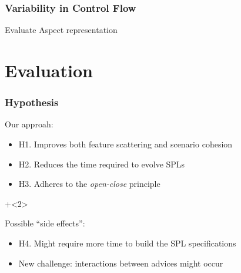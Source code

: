 \documentclass[xcolor=svgnames]{beamer}
\begin{document}
\begin{frame}
\frametitle{Variability in Control Flow}
\begin{block}{Evaluate Aspect representation}

\begin{center} 
\end{center}

\end{block}
\end{frame}



\section{Evaluation}

\begin{frame}
\frametitle{Hypothesis}

\begin{block}{Our approah:}

\begin{itemize}
  \item H1. Improves both feature scattering and scenario cohesion
  \item H2. Reduces the time required to evolve SPLs
  \item H3. Adheres to the \emph{open-close} principle
\end{itemize}
\end{block}

\onslide+<2>

\begin{block}{Possible ``side effects'':}

\begin{itemize}
  \item H4. Might require more time to build the SPL specifications
  \item New challenge: interactions between advices might occur
\end{itemize}
\end{block}

\end{frame}
\end{document}
